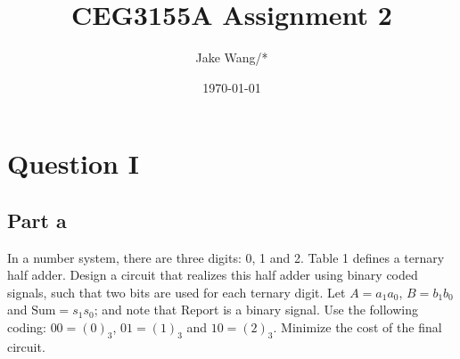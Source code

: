 \documentclass[12pt, a4paper]{article}
\title{CEG3155A Assignment 2}
\author{Jake Wang/*}
\date{\today}
\begin{document}
	\maketitle
	
	\section*{Question I}
	\subsection*{Part a}
	In a number system, there are three digits: 0, 1 and 2. Table 1 defines a ternary half adder. Design a circuit that realizes this half adder using binary coded signals, such that two bits are used for each ternary digit. Let $A = a_1a_0$, $B = b_1b_0$ and $\text{Sum} = s_1s_0$; and note that Report is a binary signal. Use the following coding: $00 = (0)_3$, $01 = (1)_3$ and $10 = (2)_3$. Minimize the cost of the final circuit.
	\begin{center}
	\end{center}
	
\end{document}
